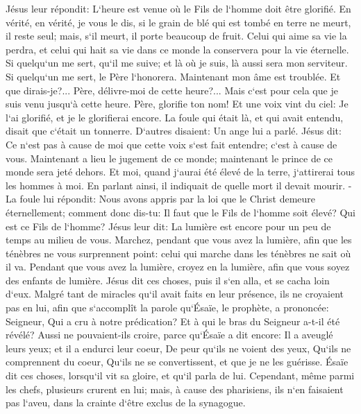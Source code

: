 \verse Jésus leur répondit: L`heure est venue où le Fils de l`homme doit être glorifié. 
\verse En vérité, en vérité, je vous le dis, si le grain de blé qui est tombé en terre ne meurt, il reste seul; mais, s`il meurt, il porte beaucoup de fruit. 
\verse Celui qui aime sa vie la perdra, et celui qui hait sa vie dans ce monde la conservera pour la vie éternelle. 
\verse Si quelqu`un me sert, qu`il me suive; et là où je suis, là aussi sera mon serviteur. Si quelqu`un me sert, le Père l`honorera. 
\verse Maintenant mon âme est troublée. Et que dirais-je?... Père, délivre-moi de cette heure?... Mais c`est pour cela que je suis venu jusqu`à cette heure. 
\verse Père, glorifie ton nom! Et une voix vint du ciel: Je l`ai glorifié, et je le glorifierai encore. 
\verse La foule qui était là, et qui avait entendu, disait que c`était un tonnerre. D`autres disaient: Un ange lui a parlé. 
\verse Jésus dit: Ce n`est pas à cause de moi que cette voix s`est fait entendre; c`est à cause de vous. 
\verse Maintenant a lieu le jugement de ce monde; maintenant le prince de ce monde sera jeté dehors. 
\verse Et moi, quand j`aurai été élevé de la terre, j`attirerai tous les hommes à moi. 
\verse En parlant ainsi, il indiquait de quelle mort il devait mourir. - 
\verse La foule lui répondit: Nous avons appris par la loi que le Christ demeure éternellement; comment donc dis-tu: Il faut que le Fils de l`homme soit élevé? Qui est ce Fils de l`homme? 
\verse Jésus leur dit: La lumière est encore pour un peu de temps au milieu de vous. Marchez, pendant que vous avez la lumière, afin que les ténèbres ne vous surprennent point: celui qui marche dans les ténèbres ne sait où il va. 
\verse Pendant que vous avez la lumière, croyez en la lumière, afin que vous soyez des enfants de lumière. Jésus dit ces choses, puis il s`en alla, et se cacha loin d`eux. 
\verse Malgré tant de miracles qu`il avait faits en leur présence, ils ne croyaient pas en lui, 
\verse afin que s`accomplît la parole qu`Ésaïe, le prophète, a prononcée: Seigneur, Qui a cru à notre prédication? Et à qui le bras du Seigneur a-t-il été révélé? 
\verse Aussi ne pouvaient-ils croire, parce qu`Ésaïe a dit encore: 
\verse Il a aveuglé leurs yeux; et il a endurci leur coeur, De peur qu`ils ne voient des yeux, Qu`ils ne comprennent du coeur, Qu`ils ne se convertissent, et que je ne les guérisse. 
\verse Ésaïe dit ces choses, lorsqu`il vit sa gloire, et qu`il parla de lui. 
\verse Cependant, même parmi les chefs, plusieurs crurent en lui; mais, à cause des pharisiens, ils n`en faisaient pas l`aveu, dans la crainte d`être exclus de la synagogue. 
